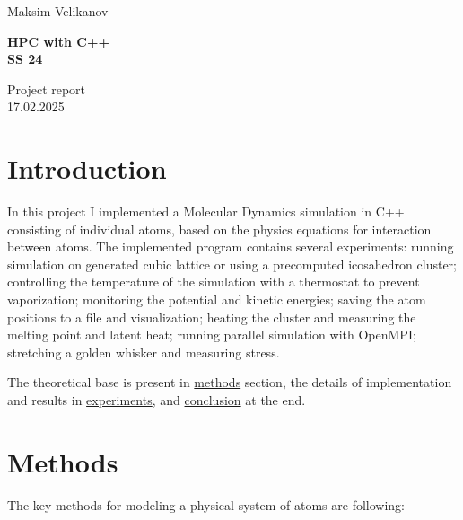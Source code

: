 \documentclass[12pt,a4paper]{article}
\title{}
\author{}
\begin{document}
\parbox{0.333\textwidth}{
	Maksim Velikanov \\[0mm]
}
\parbox{0.333\textwidth}{\vspace*{1mm}\begin{center}\large\bf%
		HPC with C++\\[0mm]
		SS 24\\[0mm]
\end{center}}
\parbox{0.333\textwidth}{
	\begin{flushright}
		Project report\\[0mm]
		17.02.2025\\[0mm]
	\end{flushright}
}
\par\vspace{-5mm}
\vspace*{2mm}
\raisebox{1.19cm}{%
	\textcolor{freiburg-gray}{\rule{\textwidth}{1.1mm}}}

\bigskip




\section{Introduction}

In this project I implemented a Molecular Dynamics simulation in C++ consisting of individual atoms, based on the physics equations for interaction between atoms. The implemented program contains several experiments: running simulation on generated cubic lattice or using a precomputed icosahedron cluster; controlling the temperature of the simulation with a thermostat to prevent vaporization; monitoring the potential and kinetic energies; saving the atom positions to a file and visualization; heating the cluster and measuring the melting point and latent heat; running parallel simulation with OpenMPI; stretching a golden whisker and measuring stress.

The theoretical base is present in \hyperref[methods]{methods} section, the details of implementation and results in \hyperref[experiments]{experiments}, and \hyperref[conclusion]{conclusion} at the end.

\section{Methods}
\label{methods}

The key methods for modeling a physical system of atoms are following:
\end{document}
